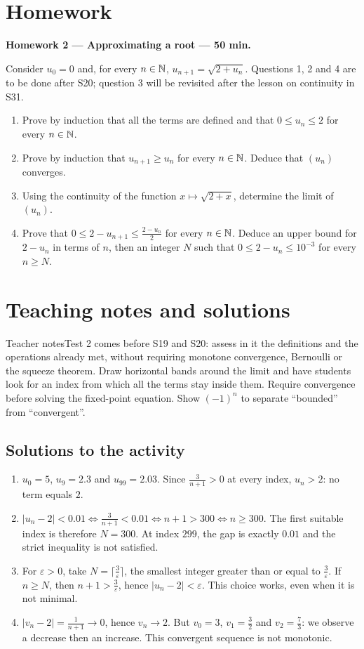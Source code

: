 \section{Homework}\textbf{Homework 2 --- Approximating a root --- 50 min.}\par Consider $u_0=0$ and, for every $n\in\mathbb N$, $u_{n+1}=\sqrt{2+u_n}$. Questions 1, 2 and 4 are to be done after S20; question 3 will be revisited after the lesson on continuity in S31.
\begin{enumerate}\item Prove by induction that all the terms are defined and that $0\le u_n\le2$ for every $n\in\mathbb N$.
\item Prove by induction that $u_{n+1}\ge u_n$ for every $n\in\mathbb N$. Deduce that $(u_n)$ converges.
\item Using the continuity of the function $x\mapsto\sqrt{2+x}$, determine the limit of $(u_n)$.
\item Prove that $0\le2-u_{n+1}\le\frac{2-u_n}{2}$ for every $n\in\mathbb N$. Deduce an upper bound for $2-u_n$ in terms of $n$, then an integer $N$ such that $0\le2-u_n\le10^{-3}$ for every $n\ge N$.\end{enumerate}

\ifprof\clearpage\section{Teaching notes and solutions}\begin{profbox}{Teacher notes}Test 2 comes before S19 and S20: assess in it the definitions and the operations already met, without requiring monotone convergence, Bernoulli or the squeeze theorem. Draw horizontal bands around the limit and have students look for an index from which all the terms stay inside them. Require convergence before solving the fixed-point equation. Show $(-1)^n$ to separate ``bounded'' from ``convergent''.\end{profbox}

\subsection{Solutions to the activity}\begin{enumerate}
\item $u_0=5$, $u_9=2.3$ and $u_{99}=2.03$. Since $\frac{3}{n+1}>0$ at every index, $u_n>2$: no term equals $2$.
\item $|u_n-2|<0.01\Longleftrightarrow \frac{3}{n+1}<0.01\Longleftrightarrow n+1>300\Longleftrightarrow n\ge300$. The first suitable index is therefore $N=300$. At index $299$, the gap is exactly $0.01$ and the strict inequality is not satisfied.
\item For $\varepsilon>0$, take $N=\lceil\frac{3}{\varepsilon}\rceil$, the smallest integer greater than or equal to $\frac{3}{\varepsilon}$. If $n\ge N$, then $n+1>\frac{3}{\varepsilon}$, hence $|u_n-2|<\varepsilon$. This choice works, even when it is not minimal.
\item $|v_n-2|=\frac{1}{n+1}\to0$, hence $v_n\to2$. But $v_0=3$, $v_1=\frac{3}{2}$ and $v_2=\frac{7}{3}$: we observe a decrease then an increase. This convergent sequence is not monotonic.
\end{enumerate}

